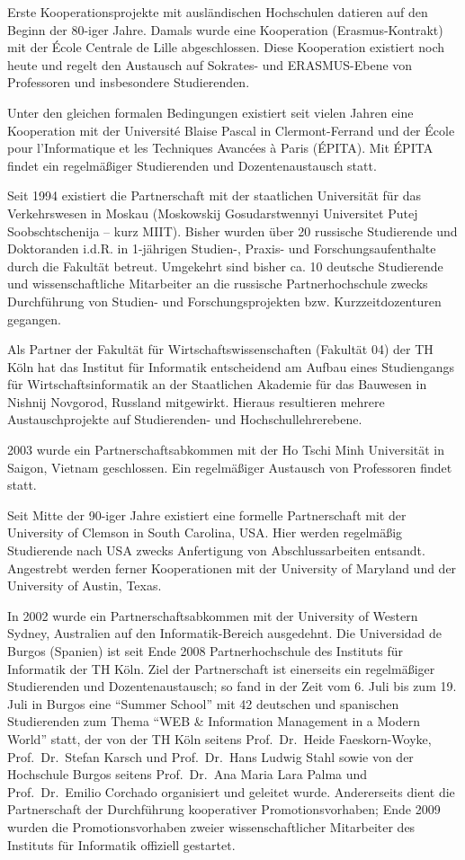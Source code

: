 Erste Kooperationsprojekte mit ausländischen Hochschulen datieren auf
den Beginn der 80-iger Jahre. Damals wurde eine Kooperation
(Erasmus-Kontrakt) mit der École Centrale de Lille abgeschlossen. Diese
Kooperation existiert noch heute und regelt den Austausch auf Sokrates-
und ERASMUS-Ebene von Professoren und insbesondere Studierenden.

Unter den gleichen formalen Bedingungen existiert seit vielen Jahren
eine Kooperation mit der Université Blaise Pascal in Clermont-Ferrand
und der École pour l'Informatique et les Techniques Avancées à Paris
(ÉPITA). Mit ÉPITA findet ein regelmäßiger Studierenden und
Dozentenaustausch statt.

Seit 1994 existiert die Partnerschaft mit der staatlichen Universität
für das Verkehrswesen in Moskau (Moskowskij Gosudarstwennyi Universitet
Putej Soobschtschenija -- kurz MIIT). Bisher wurden über 20 russische
Studierende und Doktoranden i.d.R. in 1-jährigen Studien-, Praxis- und
Forschungsaufenthalte durch die Fakultät betreut. Umgekehrt sind bisher
ca. 10 deutsche Studierende und wissenschaftliche Mitarbeiter an die
russische Partnerhochschule zwecks Durchführung von Studien- und
Forschungsprojekten bzw. Kurzzeitdozenturen gegangen.

Als Partner der Fakultät für Wirtschaftswissenschaften (Fakultät 04) der
TH Köln hat das Institut für Informatik entscheidend am Aufbau eines
Studiengangs für Wirtschaftsinformatik an der Staatlichen Akademie für
das Bauwesen in Nishnij Novgorod, Russland mitgewirkt. Hieraus
resultieren mehrere Austauschprojekte auf Studierenden- und
Hochschullehrerebene.

2003 wurde ein Partnerschaftsabkommen mit der Ho Tschi Minh Universität
in Saigon, Vietnam geschlossen. Ein regelmäßiger Austausch von
Professoren findet statt.

Seit Mitte der 90-iger Jahre existiert eine formelle Partnerschaft mit
der University of Clemson in South Carolina, USA. Hier werden regelmäßig
Studierende nach USA zwecks Anfertigung von Abschlussarbeiten entsandt.
Angestrebt werden ferner Kooperationen mit der University of Maryland
und der University of Austin, Texas.

In 2002 wurde ein Partnerschaftsabkommen mit der University of Western
Sydney, Australien auf den Informatik-Bereich ausgedehnt. Die
Universidad de Burgos (Spanien) ist seit Ende 2008 Partnerhochschule des
Instituts für Informatik der TH Köln. Ziel der Partnerschaft ist
einerseits ein regelmäßiger Studierenden und Dozentenaustausch; so fand
in der Zeit vom 6. Juli bis zum 19. Juli in Burgos eine ``Summer
School'' mit 42 deutschen und spanischen Studierenden zum Thema ``WEB \&
Information Management in a Modern World'' statt, der von der TH Köln
seitens Prof.~Dr.~Heide Faeskorn-Woyke, Prof.~Dr.~Stefan Karsch und
Prof.~Dr.~Hans Ludwig Stahl sowie von der Hochschule Burgos seitens
Prof.~Dr.~Ana Maria Lara Palma und Prof.~Dr.~Emilio Corchado organisiert
und geleitet wurde. Andererseits dient die Partnerschaft der
Durchführung kooperativer Promotionsvorhaben; Ende 2009 wurden die
Promotionsvorhaben zweier wissenschaftlicher Mitarbeiter des Instituts
für Informatik offiziell gestartet.

